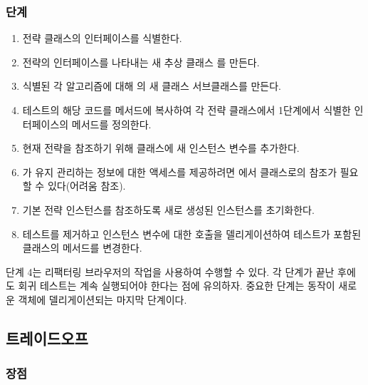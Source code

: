 \documentclass[a4paper,10pt,twoside]{book}
\begin{document}
\subsubsection*{단계}
\begin{enumerate}
\item 전략 클래스의 인터페이스를 식별한다.

\item 전략의 인터페이스를 나타내는 새 추상 클래스 를 만든다.

\item 식별된 각 알고리즘에 대해 의 새 클래스 서브클래스를 만든다.

\item 테스트의 해당 코드를 메서드에 복사하여 각 전략 클래스에서 1단계에서 식별한 인터페이스의 메서드를 정의한다. 

\item 현재 전략을 참조하기 위해  클래스에 새 인스턴스 변수를 추가한다.

\item {}가 유지 관리하는 정보에 대한 액세스를 제공하려면 에서  클래스로의 참조가 필요할 수 있다(어려움 참조).

\item 기본 전략 인스턴스를 참조하도록 새로 생성된 인스턴스를 초기화한다.

\item 테스트를 제거하고 인스턴스 변수에 대한 호출을 델리게이션하여 테스트가 포함된  클래스의 메서드를 변경한다.
\end{enumerate}

단계 4는 리팩터링 브라우저의  작업을 사용하여 수행할 수 있다. 각 단계가 끝난 후에도 회귀 테스트는 계속 실행되어야 한다는 점에 유의하자. 중요한 단계는 동작이 새로운  객체에 델리게이션되는 마지막 단계이다.

\subsection*{트레이드오프}

\subsubsection*{장점}
\end{document}
